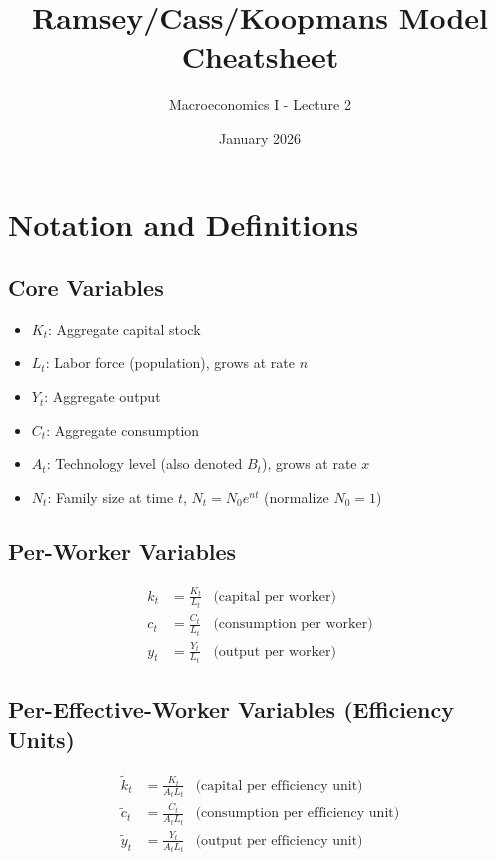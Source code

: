 \documentclass[a4paper,11pt]{article}
\newcommand{\ktilde}{\tilde{k}}
\newcommand{\ytilde}{\tilde{y}}
\newcommand{\ctilde}{\tilde{c}}
\begin{document}
\title{Ramsey/Cass/Koopmans Model Cheatsheet}
\author{Macroeconomics I - Lecture 2}
\date{January 2026}

\maketitle

\tableofcontents

\newpage

\section{Notation and Definitions}

\subsection*{Core Variables}
\begin{itemize}
    \item $K_t$: Aggregate capital stock
    \item $L_t$: Labor force (population), grows at rate $n$
    \item $Y_t$: Aggregate output
    \item $C_t$: Aggregate consumption
    \item $A_t$: Technology level (also denoted $B_t$), grows at rate $x$
    \item $N_t$: Family size at time $t$, $N_t = N_0 e^{nt}$ (normalize $N_0 = 1$)
\end{itemize}

\subsection*{Per-Worker Variables}
\begin{align*}
    k_t &= \frac{K_t}{L_t} & \text{(capital per worker)} \\
    c_t &= \frac{C_t}{L_t} & \text{(consumption per worker)} \\
    y_t &= \frac{Y_t}{L_t} & \text{(output per worker)}
\end{align*}

\subsection*{Per-Effective-Worker Variables (Efficiency Units)}
\begin{align*}
    \ktilde_t &= \frac{K_t}{A_t L_t} & \text{(capital per efficiency unit)} \\
    \ctilde_t &= \frac{C_t}{A_t L_t} & \text{(consumption per efficiency unit)} \\
    \ytilde_t &= \frac{Y_t}{A_t L_t} & \text{(output per efficiency unit)}
\end{align*}
\end{document}
